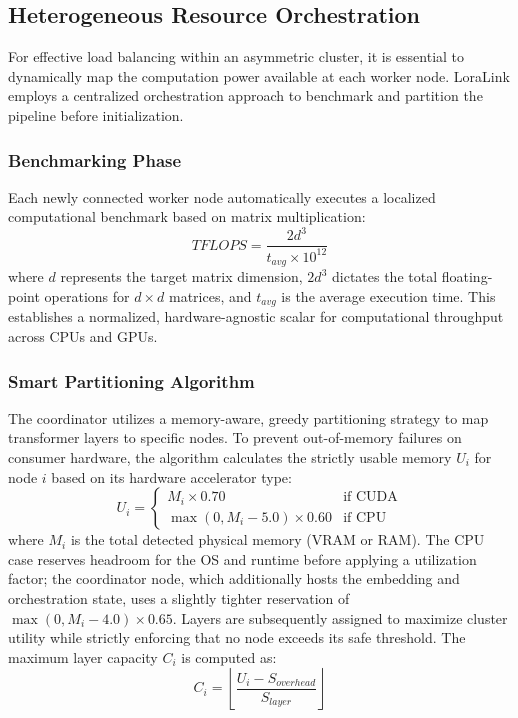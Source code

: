 \documentclass{ieeeaccess}
\begin{document}
\subsection{Heterogeneous Resource Orchestration}
For effective load balancing within an asymmetric cluster, it is essential to dynamically map the computation power available at each worker node. LoraLink employs a centralized orchestration approach to benchmark and partition the pipeline before initialization.

\subsubsection{Benchmarking Phase}
Each newly connected worker node automatically executes a localized computational benchmark based on matrix multiplication:
\begin{equation}
TFLOPS = \frac{2d^3}{t_{avg} \times 10^{12}}
\end{equation}
where $d$ represents the target matrix dimension, $2d^3$ dictates the total floating-point operations for $d \times d$ matrices, and $t_{avg}$ is the average execution time. This establishes a normalized, hardware-agnostic scalar for computational throughput across CPUs and GPUs.

\subsubsection{Smart Partitioning Algorithm}
The coordinator utilizes a memory-aware, greedy partitioning strategy to map transformer layers to specific nodes. To prevent out-of-memory failures on consumer hardware, the algorithm calculates the strictly usable memory $U_i$ for node $i$ based on its hardware accelerator type:
\begin{equation}
U_i = \begin{cases}
M_i \times 0.70 & \text{if CUDA} \\
\max(0, M_i - 5.0) \times 0.60 & \text{if CPU}
\end{cases}
\end{equation}
where $M_i$ is the total detected physical memory (VRAM or RAM). The CPU case reserves headroom for the OS and runtime before applying a utilization factor; the coordinator node, which additionally hosts the embedding and orchestration state, uses a slightly tighter reservation of $\max(0, M_i - 4.0) \times 0.65$. Layers are subsequently assigned to maximize cluster utility while strictly enforcing that no node exceeds its safe threshold. The maximum layer capacity $C_i$ is computed as:
\begin{equation}
C_i = \left\lfloor \frac{U_i - S_{overhead}}{S_{layer}} \right\rfloor
\end{equation}
\end{document}
